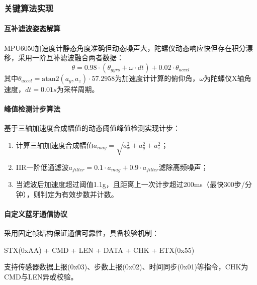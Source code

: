 \documentclass[12pt, a4paper]{ctexart}
\begin{document}
\subsubsection{关键算法实现}
\paragraph{互补滤波姿态解算}
MPU6050加速度计静态角度准确但动态噪声大，陀螺仪动态响应快但存在积分漂移，采用一阶互补滤波融合两者数据：
\begin{equation}
\theta = 0.98 \cdot (\theta_{gyro} + \omega \cdot dt) + 0.02 \cdot \theta_{accel}
\end{equation}
其中$\theta_{accel} = \mathrm{atan2}(a_y, a_z) \cdot 57.2958$为加速度计计算的俯仰角，$\omega$为陀螺仪X轴角速度，$dt=0.01s$为采样周期。

\paragraph{峰值检测计步算法}
基于三轴加速度合成幅值的动态阈值峰值检测实现计步：
\begin{enumerate}
    \item 计算三轴加速度合成幅值$a_{mag} = \sqrt{a_x^2 + a_y^2 + a_z^2}$；
    \item IIR一阶低通滤波$a_{filter} = 0.1 \cdot a_{mag} + 0.9 \cdot a_{filter}$滤除高频噪声；
    \item 当滤波后加速度超过阈值1.1g，且距离上一次计步超过200ms（最快300步/分钟），则判定为有效步数并计数。
\end{enumerate}

\paragraph{自定义蓝牙通信协议}
采用固定帧结构保证通信可靠性，具备校验机制：
\begin{center}
\ttfamily STX(0xAA) + CMD + LEN + DATA + CHK + ETX(0x55)
\end{center}
支持传感器数据上报(0x03)、步数上报(0x02)、时间同步(0x01)等指令，CHK为CMD与LEN异或校验。
\end{document}
